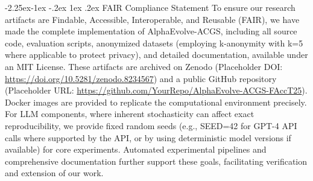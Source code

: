 \documentclass[manuscript,screen,review,anonymous,9pt]{acmart}
\makeatletter
\renewcommand\subsection{\@startsection{subsection}{2}{\z@}%
  {-2.25ex\@plus -1ex \@minus -.2ex}%
  {1ex \@plus .2ex}%
  {\normalfont\large\bfseries}}
\makeatother
\begin{document}
\subsection{FAIR Compliance Statement}
\label{app:fair_compliance}
To ensure our research artifacts are Findable, Accessible, Interoperable, and Reusable (FAIR), we have made the complete implementation of AlphaEvolve-ACGS, including all source code, evaluation scripts, anonymized datasets (employing k-anonymity with k=5 where applicable to protect privacy), and detailed documentation, available under an MIT License. These artifacts are archived on Zenodo (Placeholder DOI: \url{https://doi.org/10.5281/zenodo.8234567}) and a public GitHub repository (Placeholder URL: \url{https://github.com/YourRepo/AlphaEvolve-ACGS-FAccT25}). Docker images are provided to replicate the computational environment precisely. For LLM components, where inherent stochasticity can affect exact reproducibility, we provide fixed random seeds (e.g., SEED=42 for GPT-4 API calls where supported by the API, or by using deterministic model versions if available) for core experiments. Automated experimental pipelines and comprehensive documentation further support these goals, facilitating verification and extension of our work.
\end{document}
